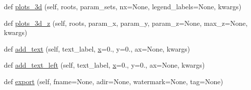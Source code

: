 \begin{DoxyCompactItemize}
\item 
def \mbox{\hyperlink{classgetdist_1_1plots_1_1GetDistPlotter_a331da209c29a04929d2e5fb97fc1e8bb}{plots\+\_\+3d}} (self, roots, param\+\_\+sets, nx=None, legend\+\_\+labels=None, kwargs)
\item 
def \mbox{\hyperlink{classgetdist_1_1plots_1_1GetDistPlotter_ad8246050feeaf02dc737682fc5b41292}{plots\+\_\+3d\+\_\+z}} (self, roots, param\+\_\+x, param\+\_\+y, param\+\_\+z=None, max\+\_\+z=None, kwargs)
\item 
def \mbox{\hyperlink{classgetdist_1_1plots_1_1GetDistPlotter_a3508bf76855c92e7e9129377b76ee390}{add\+\_\+text}} (self, text\+\_\+label, \mbox{\hyperlink{plotTT_8m_a9336ebf25087d91c818ee6e9ec29f8c1}{x}}=0., y=0., ax=None, kwargs)
\item 
def \mbox{\hyperlink{classgetdist_1_1plots_1_1GetDistPlotter_af147d1c8013996cd850d66e5c2b82df7}{add\+\_\+text\+\_\+left}} (self, text\+\_\+label, \mbox{\hyperlink{plotTT_8m_a9336ebf25087d91c818ee6e9ec29f8c1}{x}}=0., y=0., ax=None, kwargs)
\item 
def \mbox{\hyperlink{classgetdist_1_1plots_1_1GetDistPlotter_ab620b89a8337904ff357c316f040aa53}{export}} (self, fname=None, adir=None, watermark=None, tag=None)
\end{DoxyCompactItemize}
